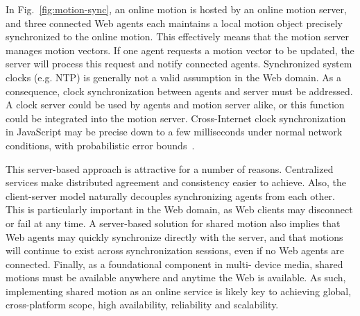In Fig.~\ref{fig:motion-sync}, an online motion is hosted by an online motion server, and three
connected Web agents each maintains a local motion object precisely synchronized to the
online motion. This effectively means that the motion server manages motion
vectors. If one agent requests a motion vector to be updated, the server will
process this request and notify connected agents. Synchronized system clocks
(e.g. NTP) is generally not a valid assumption in the Web domain. As a
consequence, clock synchronization between agents and server must be
addressed. A clock server could be used by agents and motion server alike, or
this function could be integrated into the motion server. Cross-Internet clock
synchronization in JavaScript may be precise down to a few milliseconds
under normal network conditions, with probabilistic error bounds~\cite{msv, syncreport1, syncreport2}.

This server-based approach is attractive for a number of reasons. Centralized
services make distributed agreement and consistency easier to achieve. Also,
the client-server model naturally decouples synchronizing agents from each
other. This is particularly important in the Web domain, as Web clients may
disconnect or fail at any time. A server-based solution for shared motion also
implies that Web agents may quickly synchronize directly with the server, and
that motions will continue to exist across synchronization sessions, even if
no Web agents are connected. Finally, as a foundational component in multi-
device media, shared motions must be available anywhere and anytime the Web is
available. As such, implementing shared motion as an online service is likely
key to achieving global, cross-platform scope, high availability, reliability
and scalability.




